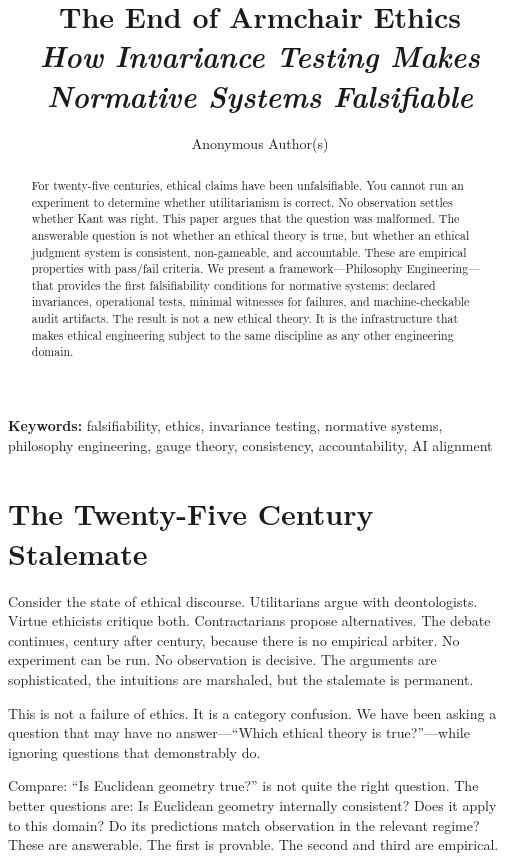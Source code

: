 \documentclass[12pt]{article}
\title{\textbf{The End of Armchair Ethics}\\[0.5em]
\large\textit{How Invariance Testing Makes Normative Systems Falsifiable}}
\author{Anonymous Author(s)}
\date{}
\begin{document}
\maketitle

\noindent\textbf{Keywords:} falsifiability, ethics, invariance testing, normative systems,
philosophy engineering, gauge theory, consistency, accountability, AI alignment

\begin{abstract}
For twenty-five centuries, ethical claims have been unfalsifiable. You cannot run an
experiment to determine whether utilitarianism is correct. No observation settles
whether Kant was right. This paper argues that the question was malformed. The
answerable question is not whether an ethical theory is true, but whether an ethical
judgment system is consistent, non-gameable, and accountable. These are empirical
properties with pass/fail criteria. We present a framework---Philosophy
Engineering---that provides the first falsifiability conditions for normative systems:
declared invariances, operational tests, minimal witnesses for failures, and machine-checkable
audit artifacts. The result is not a new ethical theory. It is the
infrastructure that makes ethical engineering subject to the same discipline as any
other engineering domain.
\end{abstract}

\section{The Twenty-Five Century Stalemate}

Consider the state of ethical discourse. Utilitarians argue with deontologists. Virtue
ethicists critique both. Contractarians propose alternatives. The debate continues,
century after century, because there is no empirical arbiter. No experiment can be
run. No observation is decisive. The arguments are sophisticated, the intuitions are
marshaled, but the stalemate is permanent.

This is not a failure of ethics. It is a category confusion. We have been asking a
question that may have no answer---``Which ethical theory is true?''---while ignoring
questions that demonstrably do.

Compare: ``Is Euclidean geometry true?'' is not quite the right question. The better
questions are: Is Euclidean geometry internally consistent? Does it apply to this
domain? Do its predictions match observation in the relevant regime? These are
answerable. The first is provable. The second and third are empirical.
\end{document}
